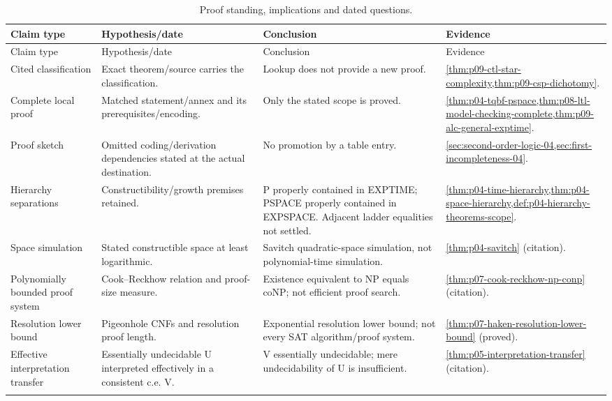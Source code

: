 \begin{landscape}
\begingroup\small\setlength{\tabcolsep}{3pt}
\begin{longtable}{@{}p{.18\linewidth}p{.25\linewidth}p{.23\linewidth}p{.26\linewidth}@{}}
\caption{Proof standing, implications and dated questions.}\label{tab:p14-dc-standing}\\
\toprule
Claim type & Hypothesis/date & Conclusion & Evidence\\\midrule
\endfirsthead
\toprule
Claim type & Hypothesis/date & Conclusion & Evidence\\\midrule
\endhead
\bottomrule\endfoot
Cited classification & Exact theorem/source carries the classification. & Lookup does not provide a new proof. & \cref{thm:p09-ctl-star-complexity,thm:p09-csp-dichotomy}.\\\addlinespace
Complete local proof & Matched statement/annex and its prerequisites/encoding. & Only the stated scope is proved. & \cref{thm:p04-tqbf-pspace,thm:p08-ltl-model-checking-complete,thm:p09-alc-general-exptime}.\\\addlinespace
Proof sketch & Omitted coding/derivation dependencies stated at the actual destination. & No promotion by a table entry. & \cref{sec:second-order-logic-04,sec:first-incompleteness-04}.\\\addlinespace
Hierarchy separations & Constructibility/growth premises retained. & P properly contained in EXPTIME; PSPACE properly contained in EXPSPACE. Adjacent ladder equalities not settled. & \cref{thm:p04-time-hierarchy,thm:p04-space-hierarchy,def:p04-hierarchy-theorems-scope}.\\\addlinespace
Space simulation & Stated constructible space at least logarithmic. & Savitch quadratic-space simulation, not polynomial-time simulation. & \cref{thm:p04-savitch} (citation).\\\addlinespace
Polynomially bounded proof system & Cook--Reckhow relation and proof-size measure. & Existence equivalent to NP equals coNP; not efficient proof search. & \cref{thm:p07-cook-reckhow-np-conp} (citation).\\\addlinespace
Resolution lower bound & Pigeonhole CNFs and resolution proof length. & Exponential resolution lower bound; not every SAT algorithm/proof system. & \cref{thm:p07-haken-resolution-lower-bound} (proved).\\\addlinespace
Effective interpretation transfer & Essentially undecidable U interpreted effectively in a consistent c.e. V. & V essentially undecidable; mere undecidability of U is insufficient. & \cref{thm:p05-interpretation-transfer} (citation).\\\addlinespace

\end{longtable}
\end{landscape}
